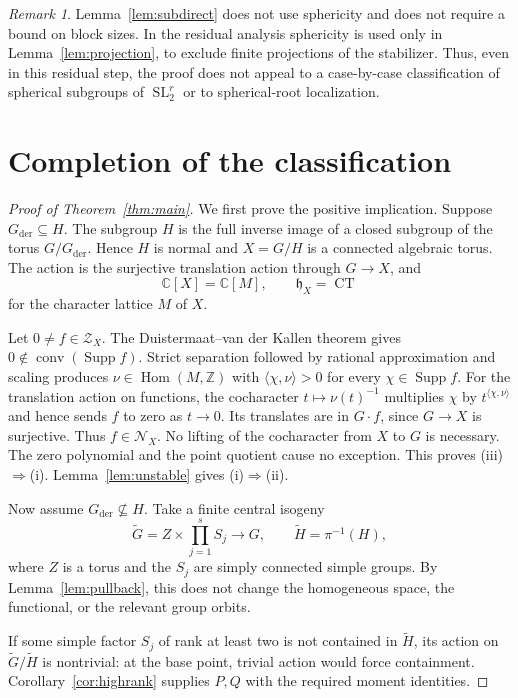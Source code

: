 \documentclass[11pt]{article}
\numberwithin{equation}{section}
\theoremstyle{definition}
\theoremstyle{remark}
\newtheorem{remark}[theorem]{Remark}
\newcommand{\C}{\mathbb C}
\newcommand{\Z}{\mathbb Z}
\newcommand{\hX}{\mathfrak h_X}
\DeclareMathOperator{\SL}{SL}
\DeclareMathOperator{\CT}{CT}
\DeclareMathOperator{\conv}{conv}
\DeclareMathOperator{\Supp}{Supp}
\newcommand{\der}{\mathrm{der}}
\begin{document}
\begin{remark}\label{rem:sphericity}
Lemma~\ref{lem:subdirect} does not use sphericity and does not require a bound on block sizes. In the residual analysis sphericity is used only in Lemma~\ref{lem:projection}, to exclude finite projections of the stabilizer. Thus, even in this residual step, the proof does not appeal to a case-by-case classification of spherical subgroups of $\SL_2^r$ or to spherical-root localization.
\end{remark}

\section{Completion of the classification}
\begin{proof}[Proof of Theorem~\ref{thm:main}]
We first prove the positive implication. Suppose $G_{\der}\subseteq H$. The subgroup $H$ is the full inverse image of a closed subgroup of the torus $G/G_{\der}$. Hence $H$ is normal and $X=G/H$ is a connected algebraic torus. The action is the surjective translation action through $G\to X$, and
\[
 \C[X]=\C[M],\qquad \hX=\CT
\]
for the character lattice $M$ of $X$.

Let $0\neq f\in\mathcal Z_X$. The Duistermaat--van der Kallen theorem \cite{DvK} gives $0\notin\conv(\Supp f)$. Strict separation followed by rational approximation and scaling produces $\nu\in\operatorname{Hom}(M,\Z)$ with $\langle\chi,\nu\rangle>0$ for every $\chi\in\Supp f$. For the translation action on functions, the cocharacter $t\mapsto\nu(t)^{-1}$ multiplies $\chi$ by $t^{\langle\chi,\nu\rangle}$ and hence sends $f$ to zero as $t\to0$. Its translates are in $G\cdot f$, since $G\to X$ is surjective. Thus $f\in\mathcal N_X$. No lifting of the cocharacter from $X$ to $G$ is necessary. The zero polynomial and the point quotient cause no exception. This proves (iii)$\Rightarrow$(i). Lemma~\ref{lem:unstable} gives (i)$\Rightarrow$(ii).

Now assume $G_{\der}\not\subseteq H$. Take a finite central isogeny
\[
 \widetilde G=Z\times\prod_{j=1}^s S_j\longrightarrow G,
 \qquad \widetilde H=\pi^{-1}(H),
\]
where $Z$ is a torus and the $S_j$ are simply connected simple groups. By Lemma~\ref{lem:pullback}, this does not change the homogeneous space, the functional, or the relevant group orbits.

If some simple factor $S_j$ of rank at least two is not contained in $\widetilde H$, its action on $\widetilde G/\widetilde H$ is nontrivial: at the base point, trivial action would force containment. Corollary~\ref{cor:highrank} supplies $P,Q$ with the required moment identities.


\end{proof}
\end{document}

